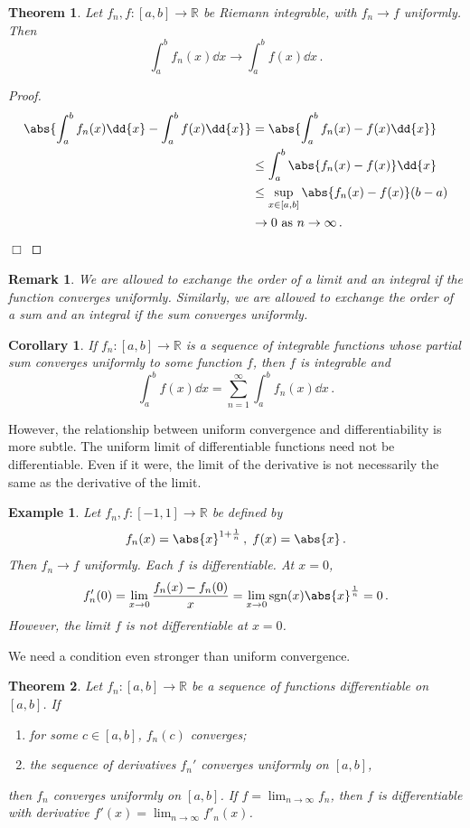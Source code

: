 \documentclass{article}
\theoremstyle{plain}\theoremheaderfont{\normalfont\itshape}\theorembodyfont{\rmfamily}\theoremseparator{.}\newtheorem*{rem}{Remark}\newtheorem*{ex}{Example}\newtheorem*{proof}{Proof}\newtheorem*{altp}{Alternative proof}
\theoremstyle{plain}\theoremheaderfont{\normalfont\bfseries}\theorembodyfont{\rmfamily}\theoremseparator{.}\newtheorem{thm}{Theorem}[section]\newtheorem{lem}[thm]{Lemma}\newtheorem{prop}[thm]{Proposition}\newtheorem*{cor}{Corollary}\newtheorem{defn}[thm]{Definition}\newtheorem{clm}[thm]{Claim}\newtheorem{clminproof}{Claim}
\theoremstyle{break}\theoremheaderfont{\normalfont\itshape}\theorembodyfont{\rmfamily}\theoremseparator{.\medskip}\newtheorem*{proofskip}{Proof}\newtheorem*{exs}{Examples}\newtheorem*{rems}{Remarks}
\theoremstyle{break}\theoremheaderfont{\normalfont\bfseries}\theorembodyfont{\rmfamily}\theoremseparator{.\medskip}\newtheorem{lemskip}[thm]{Lemma}\newtheorem{defnskip}[thm]{Definition}\newtheorem{propskip}[thm]{Proposition}\newtheorem{thmskip}[thm]{Theorem}
\numberwithin{equation}{section}
\newcommand{\qed}{\hfill\ensuremath{\Box}}
\begin{document}
	\begin{thm}
		Let \(f_n,f:[a,b]\to\mathbb{R}\) be Riemann integrable, with \(f_n\to f\) uniformly. Then
		\[\int_{a}^{b}f_n(x)\dd{x}\to\int_{a}^{b}f(x)\dd{x}\,.\]
	\end{thm}
	\begin{proof}
		\begin{align*}
			\abs{\int_{a}^{b}f_n(x)\dd{x}-\int_{a}^{b}f(x)\dd{x}}&=\abs{\int_{a}^{b}f_n(x)-f(x)\dd{x}}\\
			&\le\int_{a}^{b}\abs{f_n(x)-f(x)}\dd{x}\\
			&\le\sup_{x\in[a,b]}\abs{f_n(x)-f(x)}(b-a)\\
			&\to 0 \text{ as }n\to\infty\,.
		\end{align*}\qed
	\end{proof}
	\begin{rem}
		We are allowed to exchange the order of a limit and an integral if the function converges uniformly. Similarly, we are allowed to exchange the order of a sum and an integral if the sum converges uniformly.
	\end{rem}
	\begin{cor}
		If \(f_n:[a,b]\to\mathbb{R}\) is a sequence of integrable functions whose partial sum converges uniformly to some function \(f\), then \(f\) is integrable and
		\[\int_{a}^{b}f(x)\dd{x}=\sum_{n=1}^{\infty}\int_{a}^{b}f_n(x)\dd{x}\,.\]
	\end{cor}

	However, the relationship between uniform convergence and differentiability is more subtle. The uniform limit of differentiable functions need not be differentiable. Even if it were, the limit of the derivative is not necessarily the same as the derivative of the limit.
	\begin{ex}
		Let \(f_n,f:[-1,1]\to\mathbb{R}\) be defined by
		\[f_n(x)=\abs{x}^{1+\frac{1}{n}}\,,\; f(x)=\abs{x}\,.\]
		Then \(f_n\to f\) uniformly. Each \(f\) is differentiable. At \(x=0\),
		\[f_n'(0)=\lim_{x\to 0}\frac{f_n(x)-f_n(0)}{x}=\lim_{x\to 0}\mathrm{sgn}(x)\abs{x}^{\frac{1}{n}}=0\,.\]
		However, the limit \(f\) is not differentiable at \(x=0\).
	\end{ex}
	We need a condition even stronger than uniform convergence.
	\begin{thm}
		Let \(f_n:[a,b]\to\mathbb{R}\) be a sequence of functions differentiable on \([a,b]\). If
		\begin{enumerate}[topsep=0pt]
			\item[(i)] for some \(c\in[a,b]\), \(f_n(c)\) converges;
			\item[(ii)] the sequence of derivatives \(f_n'\) converges uniformly on \([a,b]\),
		\end{enumerate}
		then \(f_n\) converges uniformly on \([a,b]\). If \(f=\lim_{n\to\infty}f_n\), then \(f\) is differentiable with derivative \(f'(x)=\lim_{n\to\infty}f'_n(x)\).
	\end{thm}
\end{document}
